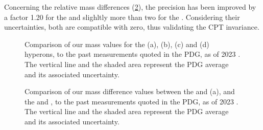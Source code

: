 Concerning the relative mass differences (\figs\ref{fig:MassDiffVsPDG}), the precision has been improved by a factor 1.20 for the \rmXiPM and slighltly more than two for the \rmOmegaPM. Considering their uncertainties, both are compatible with zero, thus validating the CPT invariance.

\begin{figure}[h]
\hspace*{-2cm}
\hspace*{-2cm}
\caption{Comparison of our mass values for the \rmXiM (a), \rmAxiP (b), \rmOmegaM (c) and \rmAomegaP (d) hyperons, to the past measurements quoted in the PDG, as of 2023 \cite{particledatagroupReviewParticlePhysics2022}. The vertical line and the shaded area represent the PDG average and its associated uncertainty.}
	\label{fig:MassVsPDG}
\end{figure}

\begin{figure}[h]
\hspace*{-2cm}
\caption{Comparison of our mass difference values between the \rmXiM and \rmAxiP (a), and the \rmOmegaM and \rmAomegaP, to the past measurements quoted in the PDG, as of 2023 \cite{particledatagroupReviewParticlePhysics2022}. The vertical line and the shaded area represent the PDG average and its associated uncertainty.}
	\label{fig:MassDiffVsPDG}
\end{figure}
